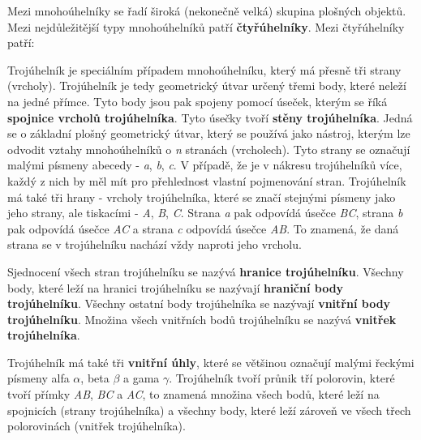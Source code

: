 

Mezi mnohoúhelníky se řadí široká (nekonečně velká) skupina plošných objektů. Mezi nejdůležitější typy mnohoúhelníků patří {\bf čtyřúhelníky}. Mezi čtyřúhelníky patří:

\vskip 4mm
\vskip 4mm



Trojúhelník je speciálním případem mnohoúhelníku, který má přesně tři strany (vrcholy). Trojúhelník je tedy geometrický útvar určený třemi body, které neleží na jedné přímce. Tyto body jsou pak spojeny pomocí úseček, kterým se říká {\bf spojnice vrcholů trojúhelníka}. Tyto úsečky tvoří {\bf stěny trojúhelníka}. Jedná se o základní plošný geometrický útvar, který se používá jako nástroj, kterým lze odvodit vztahy mnohoúhelníků o {\it n} stranách (vrcholech). Tyto strany se označují malými písmeny abecedy - {\it a}, {\it b}, {\it c}. V případě, že je v nákresu trojúhelníků více, každý z nich by měl mít pro přehlednost vlastní pojmenování stran. Trojúhelník má také tři hrany - vrcholy trojúhelníka, které se značí stejnými písmeny jako jeho strany, ale tiskacími - {\it A}, {\it B}, {\it C}. Strana {\it a} pak odpovídá úsečce {\it BC}, strana {\it b} pak odpovídá úsečce {\it AC} a strana {\it c} odpovídá úsečce {\it AB}. To znamená, že daná strana se v trojúhelníku nachází vždy naproti jeho vrcholu. 

Sjednocení všech stran trojúhelníku se nazývá {\bf hranice trojúhelníku}. Všechny body, které leží na hranici trojúhelníku se nazývají {\bf hraniční body trojúhelníku}. Všechny ostatní body trojúhelníka se nazývají {\bf vnitřní body trojúhelníku}. Množina všech vnitřních bodů trojúhelníku se nazývá {\bf vnitřek trojúhelníka}.

Trojúhelník má také tři {\bf vnitřní úhly}, které se většinou označují malými řeckými písmeny alfa $\alpha$, beta $\beta$ a gama $\gamma$. Trojúhelník tvoří průnik tří polorovin, které tvoří přímky {\it AB}, {\it BC} a {\it AC}, to znamená množina všech bodů, které leží na spojnicích (strany trojúhelníka) a všechny body, které leží zároveň ve všech třech polorovinách (vnitřek trojúhelníka).

\vskip 4mm
\centerline{}
\vskip 4mm


